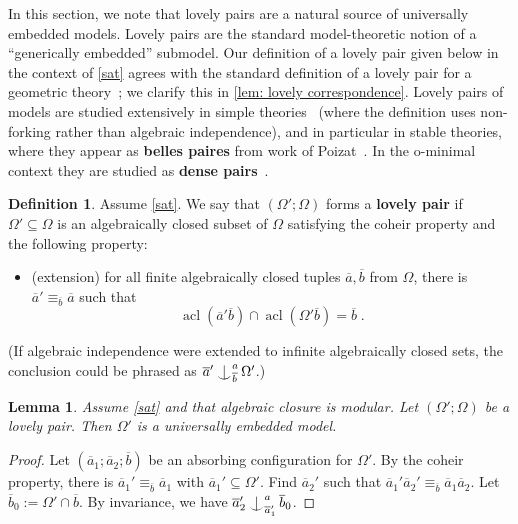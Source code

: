 \documentclass{article}
\newtheorem{lemma}[theorem]{Lemma}
\theoremstyle{remark}
\theoremstyle{definition}
\newtheorem{definition}[theorem]{Definition}
\DeclareMathOperator{\acl}{acl}
\def\b{\overline{b}}
\def\Ind#1#2{#1\setbox0=\hbox{$#1x$}\kern\wd0\hbox to 0pt{\hss$#1\mid$\hss}
	\lower.9\ht0\hbox to 0pt{\hss$#1\smile$\hss}\kern\wd0}
\def\ind{\mathop{\mathpalette\Ind{}}}
\begin{document}
{{{{{{In this section, we note that lovely pairs are a natural source of universally embedded models. Lovely pairs are the standard model-theoretic notion of a ``generically embedded'' submodel. 
Our definition of a lovely pair given below in the context of \ref{sat} agrees with the standard definition of a lovely pair for a geometric theory~\cite[Definition 2.3]{berenstein2010lovely}; we clarify this in \cref{lem: lovely correspondence}. Lovely pairs of models are  studied extensively in simple theories~\cite{ben2003lovely} (where the definition uses non-forking rather than algebraic independence), and in particular in stable theories, where they appear as \textbf{belles paires} from work of Poizat~\cite{poizat1983paires}. In the o-minimal context they are studied as \textbf{dense pairs}~\cite{van1998dense}.}



\begin{definition}\label{def:lovely} Assume \ref{sat}. We say that $(\Omega'; \Omega)$ forms a \textbf{lovely pair} if $\Omega'\subseteq\Omega$ is an algebraically closed subset of $\Omega$ satisfying the coheir property {and the following property:}
\begin{itemize}
    \item (extension) for all finite algebraically closed tuples $\overline{a}, \overline{b}$ from $\Omega$, %
      there is $\overline{a}'\equiv_{\overline{b}} \overline{a}$ such that
   \[{\acl(\overline{a}'\overline{b})\cap \acl(\Omega'\overline{b})=\overline{b}\;.}\]
\end{itemize}
 (If algebraic independence were extended to infinite algebraically closed sets, the conclusion could be phrased as $\overline{a}' \ind^{a}_{\overline{b}} \Omega'$.)
\end{definition}






\begin{lemma}\label{lem: lovely pairs} Assume \ref{sat} {and that algebraic closure is modular. Let $(\Omega';\Omega)$ be a lovely pair.}
Then $\Omega'$ is a universally embedded model.
\end{lemma}
\begin{proof}
    Let $(\overline{a}_1; \overline{a}_2; \overline{b})$ be an absorbing configuration for $\Omega'$. By the coheir property, there is  $\overline{a}_1'\equiv_{\overline{b}}\overline{a}_1$ with $\overline{a}_1'\subseteq\Omega'$. 
    Find $\overline{a}_2'$ such that $\overline{a}_1'\overline{a}_2'\equiv_{\overline{b}}\overline{a}_1\overline{a}_2$. {Let $\b_0:=\Omega'\cap \b$. By invariance, we have $\overline{a}_2'\ind^{a}_{\overline{a}_1'}\overline{b}_0$.}
    

\end{proof}}}}}}
\end{document}
